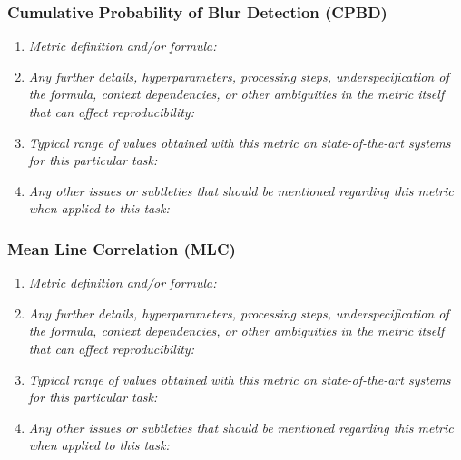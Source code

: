 \documentclass[a4paper,11pt]{article}
\begin{document}
        \subsubsection{Cumulative Probability of Blur Detection (CPBD)}
            \begin{enumerate}[label=\alph*.]
                \item \textit{Metric definition and/or formula:}
                \bigskip
                \item \textit{Any further details, hyperparameters, processing steps, underspecification of the formula, context dependencies, or other ambiguities in the metric itself that can affect reproducibility:}
                \bigskip
                \item \textit{Typical range of values obtained with this metric on state-of-the-art systems for this particular task:}
                \bigskip
                \item \textit{Any other issues or subtleties that should be mentioned regarding this metric when applied to this task:}
                \bigskip
            \end{enumerate}
        \subsubsection{Mean Line Correlation (MLC)}
            \begin{enumerate}[label=\alph*.]
                \item \textit{Metric definition and/or formula:}
                \bigskip
                \item \textit{Any further details, hyperparameters, processing steps, underspecification of the formula, context dependencies, or other ambiguities in the metric itself that can affect reproducibility:}
                \bigskip
                \item \textit{Typical range of values obtained with this metric on state-of-the-art systems for this particular task:}
                \bigskip
                \item \textit{Any other issues or subtleties that should be mentioned regarding this metric when applied to this task:}
                \bigskip
            \end{enumerate}
\end{document}
